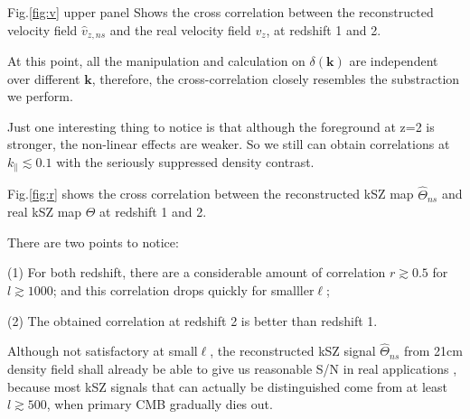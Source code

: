 Fig.\ref{fig:v} upper panel Shows the cross correlation between 
the reconstructed velocity field $\hat v_{z,ns}$ and the real velocity field $v_z$, at redshift 1 and 2. 

At this point, all the manipulation and calculation on $\delta(\bm{k})$ are independent over different $\bm{k}$, 
therefore, the cross-correlation closely resembles the substraction we perform. 

Just one interesting thing to notice is that although the foreground at z=2 is stronger, 
the non-linear effects are weaker.  
So we still can obtain correlations at $k_\parallel \lesssim 0.1$ with the seriously suppressed density contrast. 

Fig.\ref{fig:r} shows the cross correlation between the reconstructed kSZ map 
$\hat\Theta_{ns}$ and real kSZ map $\Theta$ at redshift 1 and 2. 

There are two points to notice: 

(1) For both redshift, there are a considerable amount of correlation 
$r\gtrsim0.5$ for $l\gtrsim 1000$; 
and this correlation drops quickly for smalller$\ell$; 

(2) The obtained correlation at redshift 2 is better than redshift 1.

Although not satisfactory at small$\ell$, the reconstructed kSZ signal $\hat \Theta_{ns}$ 
from 21cm density field shall already be able to give us reasonable S/N in real applications  
, because most kSZ signals that can actually be distinguished come from at least $l\gtrsim 500$, when primary CMB gradually dies out. 




